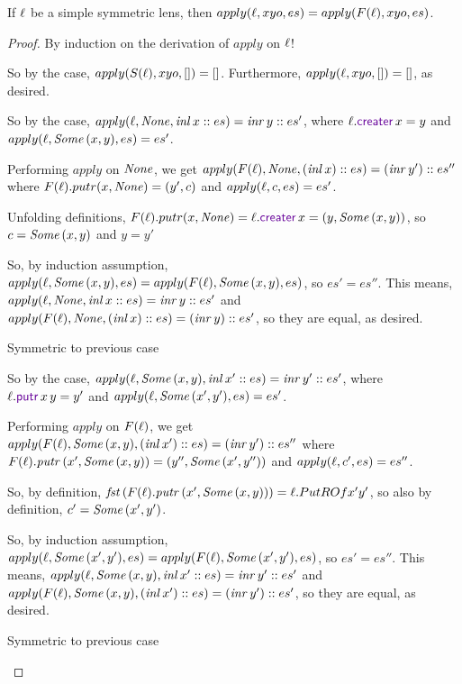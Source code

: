 \documentclass[acmsmall,screen,anonymous]{acmart}
\begin{document}
\begin{mylemma}
\label{lem:f-equiv}
  If $\mathit{\ell}$ be a simple symmetric lens, then $apply(\mathit{\ell},xyo,es) =
  apply(F(\mathit{\ell}),xyo,es)$.
\end{mylemma}
\begin{proof}
  By induction on the derivation of $apply$ on $\mathit{\ell}$!

  \begin{case}
    So by the case, $apply(S(\mathit{\ell}),xyo,[]) = []$. Furthermore,
    $apply(\mathit{\ell},xyo,[]) = []$, as desired.
  \end{case}

  \begin{case}
    So by the case, $apply(\mathit{\ell},\mathit{None},\mathit{inl} \, x::es) = \mathit{inr} \, y::es'$, where
    $\Lens.\CreateROf{x} = y$ and $apply(\mathit{\ell},\mathit{Some}\,(x,y),es) = es'$.

    Performing $apply$ on
    $\mathit{None}$, we get $apply(F(\mathit{\ell}),\mathit{None},(\mathit{inl} \, x)::es) =
    (\mathit{inr} \, y')::es''$ where $F(\mathit{\ell}).putr(x,\mathit{None}) = (y',c)$ and $apply(\mathit{\ell},c,es)
    = es'$.

    Unfolding definitions, $F(\Lens).putr(x,\None) = \Lens.\CreateROf{x} =
    (y,\SomeOf{(x,y)})$, so $c = \mathit{Some}\,(x,y)$ and $y = y'$

    So, by induction assumption, $apply(\mathit{\ell},\mathit{Some}\,(x,y),es) = apply(F(\mathit{\ell}),\mathit{Some}\,(x,y),es)$, so
    $es' = es''$.  This means, $apply(\mathit{\ell},\mathit{None},\mathit{inl} \, x::es) =
    \mathit{inr} \, y::es'$ and $apply(F(\mathit{\ell}),\mathit{None},(\mathit{inl} \, x)::es) =
    (\mathit{inr} \, y)::es'$, so they are equal, as desired.
  \end{case}

  \begin{case}
    Symmetric to previous case
  \end{case}

  \begin{case}
    So by the case, $apply(\mathit{\ell},\mathit{Some}\,(x,y),\mathit{inl} \, x'::es) = \mathit{inr} \, y'::es'$, where
    $\Lens.\PutROf{x}{y} = y'$ and $apply(\mathit{\ell},\mathit{Some}\,(x',y'),es) = es'$.

    Performing $apply$ on $F(\mathit{\ell})$, we get
    $apply(F(\mathit{\ell}),\mathit{Some}\,(x,y),(\mathit{inl} \, x')::es) = (\mathit{inr} \, y')::es''$ where
    $F(\mathit{\ell}).\mathit{putr} \, (x',\mathit{Some}\,(x,y)) = (y'',\mathit{Some}\,(x',y''))$ and
    $apply(\mathit{\ell},c',es) = es''$.
    
    So, by definition, $\mathit{fst} \, (F(\mathit{\ell}).\mathit{putr} \, (x',\mathit{Some}\,(x,y)))
    = \mathit{\ell}.PutROf{x'}{y'}$, so also by definition, $c' = \mathit{Some}\,(x',y')$.

    So, by induction assumption, $apply(\mathit{\ell},\mathit{Some}\,(x',y'),es) =
    apply(F(\mathit{\ell}),\mathit{Some}\,(x',y'),es)$, so $es' = es''$. This means,
    $apply(\mathit{\ell},\mathit{Some}\,(x,y),\mathit{inl} \, x'::es) = \mathit{inr} \, y'::es'$ and
    $apply(F(\mathit{\ell}),\mathit{Some}\,(x,y),(\mathit{inl} \, x')::es) = (\mathit{inr} \, y')::es'$, so
    they are equal, as desired.
  \end{case}

  \begin{case}
    Symmetric to previous case
  \end{case}
\end{proof}
\end{document}

